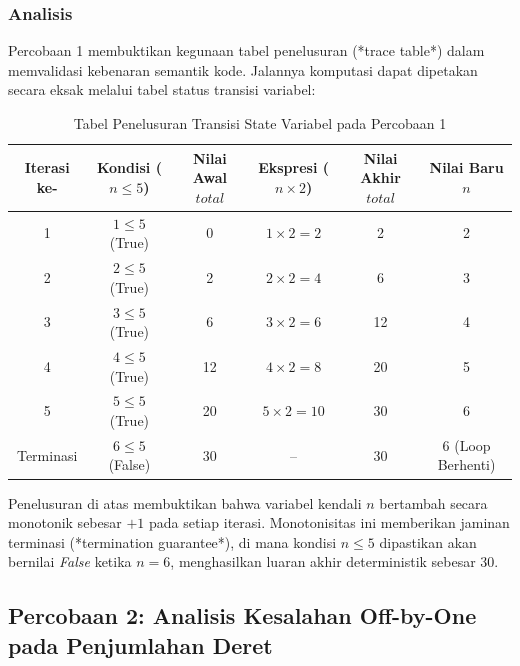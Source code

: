 \documentclass[12pt,a4paper]{article}
\begin{document}
\subsubsection{Analisis}
Percobaan 1 membuktikan kegunaan tabel penelusuran (*trace table*) dalam memvalidasi kebenaran semantik kode. Jalannya komputasi dapat dipetakan secara eksak melalui tabel status transisi variabel:
\begin{table}[H]
\centering
\small
\renewcommand{\arraystretch}{1.2}
\begin{tabular}{cccccc}
\toprule
\textbf{Iterasi ke-} & \textbf{Kondisi ($n \le 5$)} & \textbf{Nilai Awal $total$} & \textbf{Ekspresi ($n \times 2$)} & \textbf{Nilai Akhir $total$} & \textbf{Nilai Baru $n$} \\
\midrule
1 & $1 \le 5$ (True) & 0 & $1 \times 2 = 2$ & 2 & 2 \\
2 & $2 \le 5$ (True) & 2 & $2 \times 2 = 4$ & 6 & 3 \\
3 & $3 \le 5$ (True) & 6 & $3 \times 2 = 6$ & 12 & 4 \\
4 & $4 \le 5$ (True) & 12 & $4 \times 2 = 8$ & 20 & 5 \\
5 & $5 \le 5$ (True) & 20 & $5 \times 2 = 10$ & 30 & 6 \\
Terminasi & $6 \le 5$ (False) & 30 & -- & 30 & 6 (Loop Berhenti) \\
\bottomrule
\end{tabular}
\caption{Tabel Penelusuran Transisi State Variabel pada Percobaan 1}
\end{table}
Penelusuran di atas membuktikan bahwa variabel kendali $n$ bertambah secara monotonik sebesar $+1$ pada setiap iterasi. Monotonisitas ini memberikan jaminan terminasi (*termination guarantee*), di mana kondisi $n \le 5$ dipastikan akan bernilai \textit{False} ketika $n = 6$, menghasilkan luaran akhir deterministik sebesar 30.

\subsection{Percobaan 2: Analisis Kesalahan Off-by-One pada Penjumlahan Deret}
\end{document}
